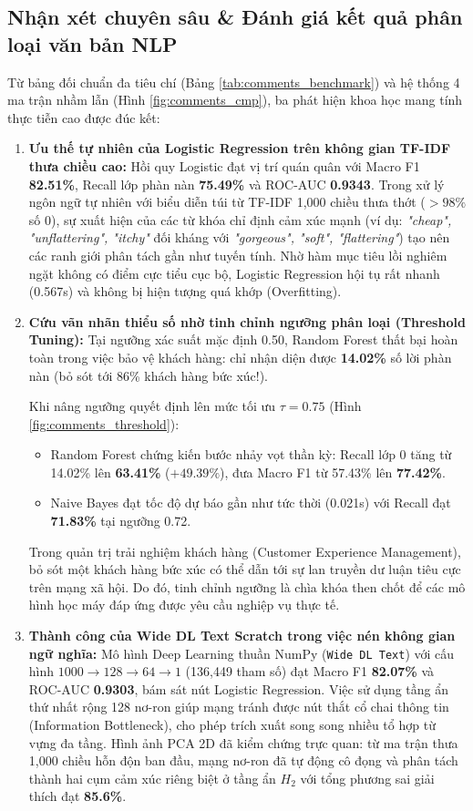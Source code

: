 \documentclass[12pt,a4paper]{report}
\begin{document}
\subsection{Nhận xét chuyên sâu \& Đánh giá kết quả phân loại văn bản NLP}
Từ bảng đối chuẩn đa tiêu chí (Bảng \ref{tab:comments_benchmark}) và hệ thống 4 ma trận nhầm lẫn (Hình \ref{fig:comments_cmp}), ba phát hiện khoa học mang tính thực tiễn cao được đúc kết:
\begin{enumerate}
    \item \textbf{Ưu thế tự nhiên của Logistic Regression trên không gian TF-IDF thưa chiều cao:}
    Hồi quy Logistic đạt vị trí quán quân với Macro F1 \textbf{82.51\%}, Recall lớp phàn nàn \textbf{75.49\%} và ROC-AUC \textbf{0.9343}. Trong xử lý ngôn ngữ tự nhiên với biểu diễn túi từ TF-IDF 1,000 chiều thưa thớt ($> 98\%$ số 0), sự xuất hiện của các từ khóa chỉ định cảm xúc mạnh (ví dụ: \textit{"cheap", "unflattering", "itchy"} đối kháng với \textit{"gorgeous", "soft", "flattering"}) tạo nên các ranh giới phân tách gần như tuyến tính. Nhờ hàm mục tiêu lồi nghiêm ngặt không có điểm cực tiểu cục bộ, Logistic Regression hội tụ rất nhanh (0.567s) và không bị hiện tượng quá khớp (Overfitting).

    \item \textbf{Cứu vãn nhãn thiểu số nhờ tinh chỉnh ngưỡng phân loại (Threshold Tuning):}
    Tại ngưỡng xác suất mặc định 0.50, Random Forest thất bại hoàn toàn trong việc bảo vệ khách hàng: chỉ nhận diện được \textbf{14.02\%} số lời phàn nàn (bỏ sót tới 86\% khách hàng bức xúc!). 
    
    Khi nâng ngưỡng quyết định lên mức tối ưu $\tau = 0.75$ (Hình \ref{fig:comments_threshold}):
    \begin{itemize}
        \item Random Forest chứng kiến bước nhảy vọt thần kỳ: Recall lớp 0 tăng từ 14.02\% lên \textbf{63.41\%} ($+49.39\%$), đưa Macro F1 từ 57.43\% lên \textbf{77.42\%}.
        \item Naive Bayes đạt tốc độ dự báo gần như tức thời (0.021s) với Recall đạt \textbf{71.83\%} tại ngưỡng 0.72.
    \end{itemize}
    Trong quản trị trải nghiệm khách hàng (Customer Experience Management), bỏ sót một khách hàng bức xúc có thể dẫn tới sự lan truyền dư luận tiêu cực trên mạng xã hội. Do đó, tinh chỉnh ngưỡng là chìa khóa then chốt để các mô hình học máy đáp ứng được yêu cầu nghiệp vụ thực tế.

    \item \textbf{Thành công của Wide DL Text Scratch trong việc nén không gian ngữ nghĩa:}
    Mô hình Deep Learning thuần NumPy (\texttt{Wide DL Text}) với cấu hình $1000 \to 128 \to 64 \to 1$ (136,449 tham số) đạt Macro F1 \textbf{82.07\%} và ROC-AUC \textbf{0.9303}, bám sát nút Logistic Regression. Việc sử dụng tầng ẩn thứ nhất rộng 128 nơ-ron giúp mạng tránh được nút thắt cổ chai thông tin (Information Bottleneck), cho phép trích xuất song song nhiều tổ hợp từ vựng đa tầng. Hình ảnh PCA 2D đã kiểm chứng trực quan: từ ma trận thưa 1,000 chiều hỗn độn ban đầu, mạng nơ-ron đã tự động cô đọng và phân tách thành hai cụm cảm xúc riêng biệt ở tầng ẩn $H_2$ với tổng phương sai giải thích đạt \textbf{85.6\%}.
\end{enumerate}
\end{document}
